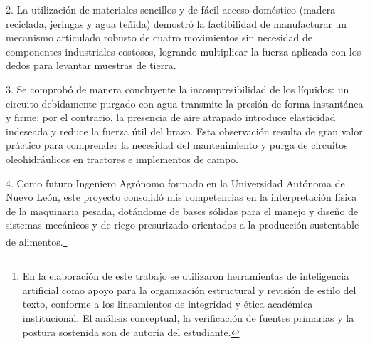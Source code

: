 2. La utilización de materiales sencillos y de fácil acceso doméstico (madera reciclada, jeringas y agua teñida) demostró la factibilidad de manufacturar un mecanismo articulado robusto de cuatro movimientos sin necesidad de componentes industriales costosos, logrando multiplicar la fuerza aplicada con los dedos para levantar muestras de tierra.

3. Se comprobó de manera concluyente la incompresibilidad de los líquidos: un circuito debidamente purgado con agua transmite la presión de forma instantánea y firme; por el contrario, la presencia de aire atrapado introduce elasticidad indeseada y reduce la fuerza útil del brazo. Esta observación resulta de gran valor práctico para comprender la necesidad del mantenimiento y purga de circuitos oleohidráulicos en tractores e implementos de campo.

4. Como futuro Ingeniero Agrónomo formado en la Universidad Autónoma de Nuevo León, este proyecto consolidó mis competencias en la interpretación física de la maquinaria pesada, dotándome de bases sólidas para el manejo y diseño de sistemas mecánicos y de riego presurizado orientados a la producción sustentable de alimentos.\footnote{En la elaboración de este trabajo se utilizaron herramientas de inteligencia artificial como apoyo para la organización estructural y revisión de estilo del texto, conforme a los lineamientos de integridad y ética académica institucional. El análisis conceptual, la verificación de fuentes primarias y la postura sostenida son de autoría del estudiante.}

